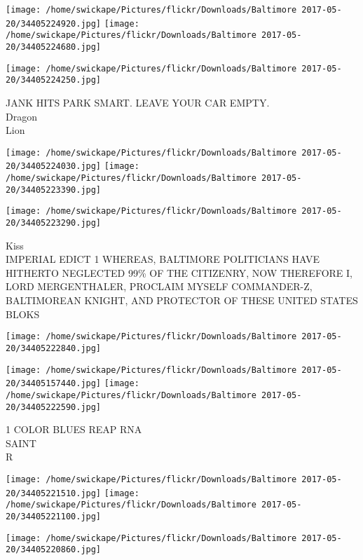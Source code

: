 \documentclass[10pt,letterpaper]{article}
\begin{document}
\texttt{[image: /home/swickape/Pictures/flickr/Downloads/Baltimore 2017-05-20/34405224920.jpg]}
\texttt{[image: /home/swickape/Pictures/flickr/Downloads/Baltimore 2017-05-20/34405224680.jpg]}

\vspace{0.25in}
\texttt{[image: /home/swickape/Pictures/flickr/Downloads/Baltimore 2017-05-20/34405224250.jpg]}

JANK HITS PARK SMART. LEAVE YOUR CAR EMPTY.\\
Dragon\\
Lion
\pagebreak

\texttt{[image: /home/swickape/Pictures/flickr/Downloads/Baltimore 2017-05-20/34405224030.jpg]}
\texttt{[image: /home/swickape/Pictures/flickr/Downloads/Baltimore 2017-05-20/34405223390.jpg]}

\vspace{0.25in}
\texttt{[image: /home/swickape/Pictures/flickr/Downloads/Baltimore 2017-05-20/34405223290.jpg]}

Kiss\\
IMPERIAL EDICT 1 WHEREAS, BALTIMORE POLITICIANS HAVE HITHERTO NEGLECTED 99\% OF THE CITIZENRY, NOW THEREFORE I, LORD MERGENTHALER, PROCLAIM MYSELF COMMANDER{-}Z, BALTIMOREAN KNIGHT, AND PROTECTOR OF THESE UNITED STATES\\
BLOKS
\pagebreak

\texttt{[image: /home/swickape/Pictures/flickr/Downloads/Baltimore 2017-05-20/34405222840.jpg]}

\vspace{0.25in}
\texttt{[image: /home/swickape/Pictures/flickr/Downloads/Baltimore 2017-05-20/34405157440.jpg]}
\texttt{[image: /home/swickape/Pictures/flickr/Downloads/Baltimore 2017-05-20/34405222590.jpg]}

1 COLOR BLUES REAP RNA\\
SAINT\\
R
\pagebreak

\texttt{[image: /home/swickape/Pictures/flickr/Downloads/Baltimore 2017-05-20/34405221510.jpg]}
\texttt{[image: /home/swickape/Pictures/flickr/Downloads/Baltimore 2017-05-20/34405221100.jpg]}

\vspace{0.25in}
\texttt{[image: /home/swickape/Pictures/flickr/Downloads/Baltimore 2017-05-20/34405220860.jpg]}
\end{document}
